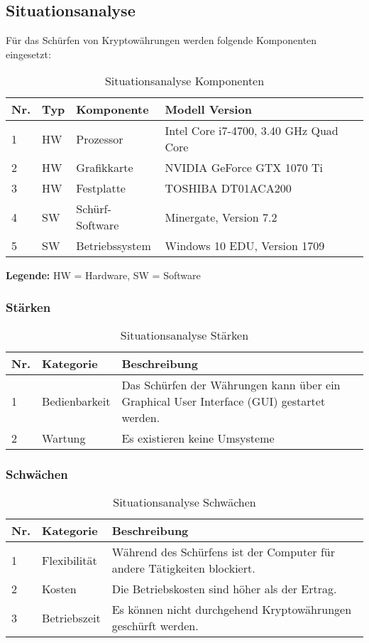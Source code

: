 \subsection{Situationsanalyse}
Für das Schürfen von Kryptowährungen werden folgende Komponenten eingesetzt:
\begin{table}[H]
\begin{tabular}[t]{p{0.5cm}p{0.8cm}p{6.7cm}p{6.7cm}}
\hline
\rowcolor{heading}\textbf{Nr.} & \textbf{Typ} & \textbf{Komponente} & \textbf{Modell \/Version} \\\hline
1 & HW & Prozessor & Intel Core i7-4700, 3.40 GHz Quad Core \\\hline
2 & HW & Grafikkarte & NVIDIA GeForce GTX 1070 Ti  \\\hline
3 & HW & Festplatte & TOSHIBA DT01ACA200  \\\hline
4 & SW & Schürf-Software & Minergate, Version 7.2  \\\hline
5 & SW & Betriebssystem & Windows 10 EDU, Version 1709 \\\hline
\end{tabular}
\caption{Situationsanalyse Komponenten}
\end{table}


\textbf{Legende:} HW = Hardware, SW = Software

\subsubsection{Stärken}
\begin{table}[H]
\begin{tabular}[t]{p{0.5cm}p{4.1cm}p{10.1cm}}
\hline
\rowcolor{heading}\textbf{Nr.} & \textbf{Kategorie} & \textbf{Beschreibung} \\\hline
1 & Bedienbarkeit & Das Schürfen der Währungen kann über ein Graphical User Interface (GUI) gestartet werden. \\\hline
2 & Wartung & Es existieren keine Umsysteme  \\\hline
\end{tabular}
\caption{Situationsanalyse Stärken}
\end{table}

\subsubsection{Schwächen}
\begin{table}[H]
\begin{tabular}[t]{p{0.5cm}p{4.1cm}p{10.1cm}}
\hline
\rowcolor{heading}\textbf{Nr.} & \textbf{Kategorie} & \textbf{Beschreibung} \\\hline
1 & Flexibilität & Während des Schürfens ist der Computer für andere Tätigkeiten blockiert. \\\hline
2 & Kosten & Die Betriebskosten sind höher als der Ertrag.  \\\hline
3 & Betriebszeit & Es können nicht durchgehend Kryptowährungen geschürft werden.  \\\hline
\end{tabular}
\caption{Situationsanalyse Schwächen}
\end{table}